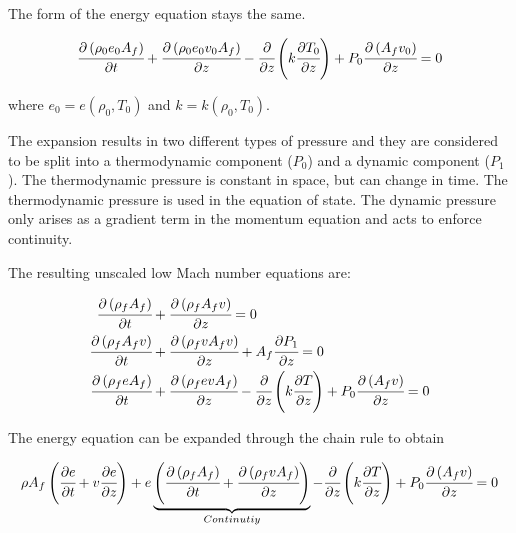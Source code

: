 \documentclass[../Article_Model_Parameters.tex]{subfiles}
\begin{document}
	The form of the energy equation stays the same. 
	
	{\footnotesize
		\begin{equation*}
			\cfrac{\partial \left( \rho_0 e_0 A_f \right) }{\partial t} + \cfrac{\partial \left( \rho_0 e_0 v_0 A_f \right)}{\partial z} - \cfrac{\partial}{\partial z} \left( k \cfrac{\partial T_0}{\partial z} \right) + P_0 \cfrac{\partial \left(A_f v_0\right)}{\partial z} = 0
		\end{equation*}
	}
	
	where $e_0 = e(\rho_0, T_0)$ and $k=k(\rho_0, T_0)$.
		
	The expansion results in two different types of pressure and they are considered to be split into a thermodynamic component ($P_0$) and a dynamic component ($P_1$). The thermodynamic pressure is constant in space, but can change in time. The thermodynamic pressure is used in the equation of state. The dynamic pressure only arises as a gradient term in the momentum equation and acts to enforce continuity.
	
	The resulting unscaled low Mach number equations are:
	
	{\footnotesize
		\begin{align*}
			\cfrac{\partial \left( \rho_f A_f \right)}{\partial t} &+ \cfrac{\partial \left( \rho_f A_f v \right)}{\partial z} = 0 \\
			\cfrac{\partial \left( \rho_f A_f v \right) }{\partial t}	&+ \cfrac{\partial \left( \rho_f v A_f v \right)}{\partial z} + A_f \cfrac{\partial P_1}{\partial z} = 0\\
			\cfrac{\partial \left( \rho_f e A_f \right) }{\partial t} &+ \cfrac{\partial \left( \rho_f e v A_f \right)}{\partial z} - \cfrac{\partial}{\partial z} \left( k \cfrac{\partial T}{\partial z} \right) + P_0 \cfrac{\partial \left(A_f v\right)}{\partial z} = 0
		\end{align*}
	}
	
	The energy equation can be expanded through the chain rule to obtain
	
	{\footnotesize
		\begin{equation*}
			 \rho A_f \left( \cfrac{\partial e }{\partial t} + v \cfrac{\partial e}{\partial z} \right) + e  \underbrace{ \left( \cfrac{\partial \left( \rho_f A_f \right) }{\partial t} + \cfrac{\partial \left( \rho_f v A_f \right)}{\partial z} \right) }_{Continutiy}  - \cfrac{\partial}{\partial z} \left( k \cfrac{\partial T}{\partial z} \right) + P_0 \cfrac{\partial \left(A_f v\right)}{\partial z} = 0
		\end{equation*}
	}
\end{document}
